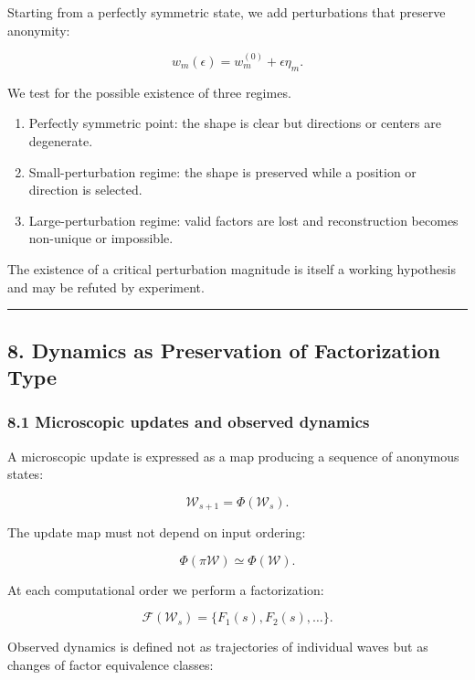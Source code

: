 \documentclass[
  a4paper,
]{article}
\providecommand{\tightlist}{%
  \setlength{\itemsep}{0pt}\setlength{\parskip}{0pt}}
\begin{document}
Starting from a perfectly symmetric state, we add perturbations that
preserve anonymity:

\[
w_m(\epsilon)
=
w_m^{(0)}+\epsilon\eta_m.
\]

We test for the possible existence of three regimes.

\begin{enumerate}
\def\labelenumi{\arabic{enumi}.}
\tightlist
\item
  Perfectly symmetric point: the shape is clear but directions or
  centers are degenerate.
\item
  Small-perturbation regime: the shape is preserved while a position or
  direction is selected.
\item
  Large-perturbation regime: valid factors are lost and reconstruction
  becomes non-unique or impossible.
\end{enumerate}

The existence of a critical perturbation magnitude is itself a working
hypothesis and may be refuted by experiment.

\begin{center}\rule{0.5\linewidth}{0.5pt}\end{center}

\subsection{8. Dynamics as Preservation of Factorization
Type}\label{dynamics-as-preservation-of-factorization-type}

\subsubsection{8.1 Microscopic updates and observed
dynamics}\label{microscopic-updates-and-observed-dynamics}

A microscopic update is expressed as a map producing a sequence of
anonymous states:

\[
\mathcal W_{s+1}
=
\Phi(\mathcal W_s).
\]

The update map must not depend on input ordering:

\[
\Phi(\pi\mathcal W)
\simeq
\Phi(\mathcal W).
\]

At each computational order we perform a factorization:

\[
\mathcal F(\mathcal W_s)
=
\{F_1(s),F_2(s),\ldots\}.
\]

Observed dynamics is defined not as trajectories of individual waves but
as changes of factor equivalence classes:
\end{document}
